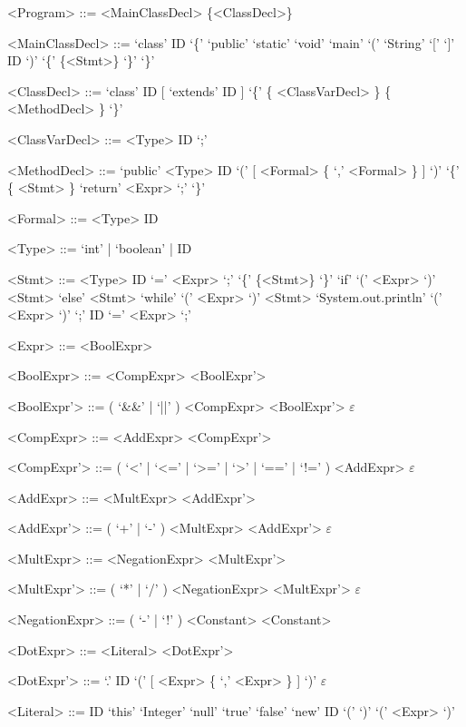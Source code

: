 \documentclass{report}
\begin{document}
\setlength{\grammarparsep}{8pt} %
\setlength{\grammarindent}{12em} %

\begin{grammar}

<Program> ::= <MainClassDecl> \{<ClassDecl>\}

<MainClassDecl> ::= `class' ID `\{' `public' `static' `void' `main' `(' `String' `[' `]' ID `)' `\{' \{<Stmt>\} `\}' `\}'

<ClassDecl> ::= `class' ID [ `extends' ID ] `\{' \{ <ClassVarDecl> \} \{ <MethodDecl> \} `\}'

<ClassVarDecl> ::= <Type> ID `;'

<MethodDecl> ::= `public' <Type> ID `(' [ <Formal> \{ `,' <Formal> \} ] `)' `\{' \{ <Stmt> \} `return' <Expr> `;' `\}'

<Formal> ::= <Type> ID

<Type> ::= `int' | `boolean' | ID

<Stmt> ::= <Type> ID `=' <Expr> `;'
\alt `\{' \{<Stmt>\} `\}'
\alt `if' `(' <Expr> `)' <Stmt> `else' <Stmt>
\alt `while' `(' <Expr> `)' <Stmt>
\alt `System.out.println' `(' <Expr> `)' `;'
\alt ID `=' <Expr> `;'

<Expr> ::= <BoolExpr>

<BoolExpr> ::= <CompExpr> <BoolExpr'>

<BoolExpr'> ::= ( `&&' | `||' ) <CompExpr> <BoolExpr'>
\alt $\varepsilon$

<CompExpr> ::= <AddExpr> <CompExpr'>

<CompExpr'> ::= ( `<' | `<=' | `>=' | `>' | `==' | `!=' ) <AddExpr>
\alt $\varepsilon$

<AddExpr> ::= <MultExpr> <AddExpr'>

<AddExpr'> ::= ( `+' | `-' ) <MultExpr> <AddExpr'>
\alt $\varepsilon$


<MultExpr> ::= <NegationExpr> <MultExpr'>

<MultExpr'> ::= ( `*' | `/' ) <NegationExpr> <MultExpr'>
\alt $\varepsilon$

<NegationExpr> ::= ( `-' | `!' ) <Constant>
\alt <Constant>

<DotExpr> ::= <Literal> <DotExpr'>

<DotExpr'> ::= `.' ID `(' [ <Expr> \{ `,' <Expr> \} ] `)'
\alt $\varepsilon$

<Literal> ::= ID
\alt `this'
\alt `Integer'
\alt `null'
\alt `true'
\alt `false'
\alt `new' ID `(' `)'
\alt `(' <Expr> `)'

\end{grammar}
\end{document}

